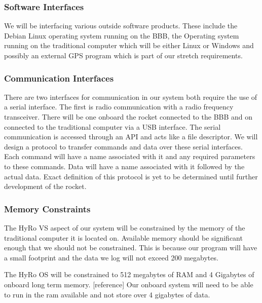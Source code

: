 \documentclass[10pt,draftclsnofoot,onecolumn,compsoc]{IEEEtran}
\begin{document}
\subsubsection{Software Interfaces}
	We will be interfacing various outside software products. These include the Debian Linux operating system running on the BBB, the Operating system running on the traditional computer which will be either Linux or Windows and possibly an external GPS program which is part of our stretch requirements.

\subsubsection{Communication Interfaces}
There are two interfaces for communication in our system both require the use of a serial interface. The first is radio communication with a radio frequency transceiver. There will be one onboard the rocket connected to the BBB and on connected to the traditional computer via a USB interface. The serial communication is accessed through an API and acts like a file descriptor. We will design a protocol to transfer commands and data over these serial interfaces. Each command will have a name associated with it and any required parameters to these commands. Data will have a name associated with it followed by the actual data. Exact definition of this protocol is yet to be determined until further development of the rocket.
\subsubsection{Memory Constraints}
The HyRo VS aspect of our system will be constrained by the memory of the traditional computer it is located on. Available memory should be significant enough that we should not be constrained. This is because our program will have a small footprint and the data we log will not exceed 200 megabytes.\par 
	The HyRo OS will be constrained to 512 megabytes of RAM and 4 Gigabytes of onboard long term memory. [reference] Our onboard system will need to be able to run in the ram available and not store over 4 gigabytes of data.
\end{document}
